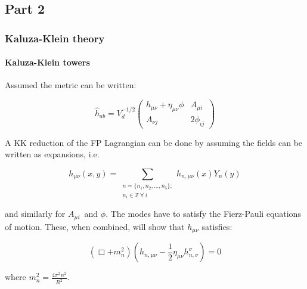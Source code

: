 \documentclass[10pt]{beamer}
\begin{document}
	\subsection{Part 2}
	\begin{frame}
		\frametitle{Kaluza-Klein theory}
		\framesubtitle{Kaluza-Klein towers}
		Assumed the metric can be written:
		
		\begin{equation}
			\hat{h}_{ab} = 
			V_d^{-1/2}\begin{pmatrix}
			h_{\mu\nu} + \eta_{\mu\nu}\phi & A_{\mu i}\\
			A_{\nu j} & 2\phi_{ij}
			\end{pmatrix}
		\end{equation}
		
		A KK reduction of the FP Lagrangian can be done by assuming the fields can be written as expansions, i.e.
		
		\begin{equation}
			h_{\mu\nu}(x,y) = \sum_{\substack{n=\{n_1,n_2,\ldots,n_5\}; \\ n_i\in\mathbb{Z}\:\forall\:i}} h_{n,\mu\nu}(x)Y_n(y)
		\end{equation}
		
		and similarly for $A_{\mu i}$ and $\phi$. The modes have to satisfy the Fierz-Pauli equations of motion. These, when combined, will show that $h_{\mu\nu}$ satisfies:
		
		\begin{equation}
			(\Box + m_n^2)(h_{n,\mu\nu}-\frac{1}{2}\eta_{\mu\nu}h_{n,\sigma}^\sigma) = 0 
		\end{equation}
		
		where $m_n^2 = \frac{4\pi^2 n^2}{R^2}$.
	\end{frame}
	
\end{document}
